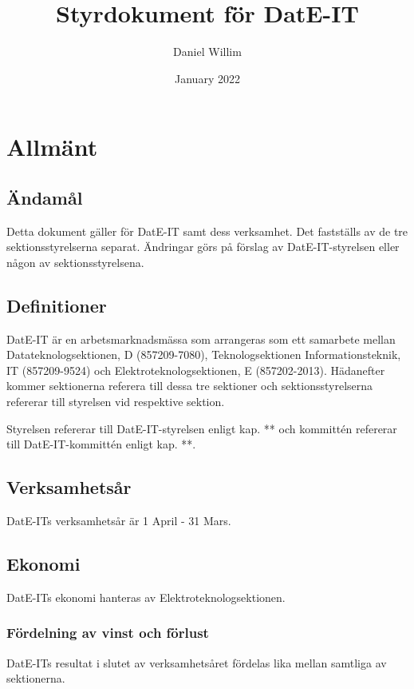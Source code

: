 \documentclass{article}
\title{Styrdokument för DatE-IT}
\author{Daniel Willim}
\date{January 2022}
\begin{document}
\maketitle

\begin{comment}
TODO 
- Fixa så att alla sektion pekar på detta dokument
- E ska fastslå budget men ska inte kunna ändra saker - delegerat detta mandat till oss
\end{comment}

\section{Allmänt}
\subsection{Ändamål}
Detta dokument gäller för DatE-IT samt dess verksamhet. Det fastställs av de tre sektionsstyrelserna separat. Ändringar görs på förslag av DatE-IT-styrelsen eller någon av sektionsstyrelsena.

\subsection{Definitioner}
DatE-IT är en arbetsmarknadsmässa som arrangeras som ett samarbete mellan Datateknologsektionen, D (857209-7080), Teknologsektionen Informationsteknik, IT (857209-9524) och Elektroteknologsektionen, E (857202-2013). Hädanefter kommer sektionerna referera till dessa tre sektioner och sektionsstyrelserna refererar till styrelsen vid respektive sektion.

Styrelsen refererar till DatE-IT-styrelsen enligt kap. ** och kommittén refererar till DatE-IT-kommittén enligt kap. **.

\subsection{Verksamhetsår}
DatE-ITs verksamhetsår är 1 April - 31 Mars. 

\subsection{Ekonomi}
DatE-ITs ekonomi hanteras av Elektroteknologsektionen. 

\subsubsection{Fördelning av vinst och förlust}
DatE-ITs resultat i slutet av verksamhetsåret fördelas lika mellan samtliga av sektionerna.
\end{document}
